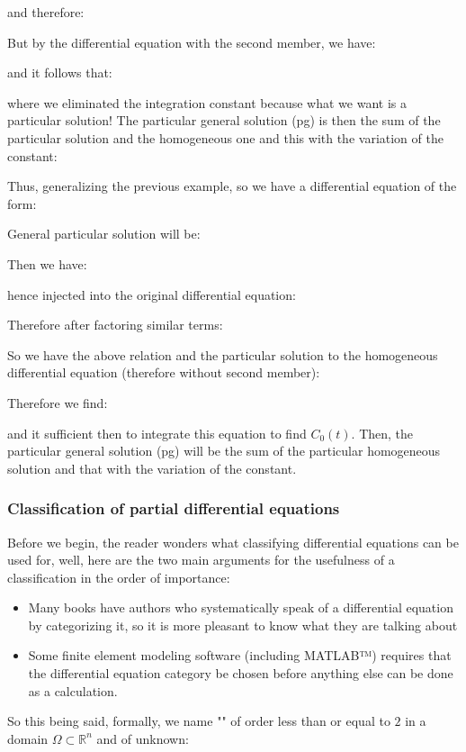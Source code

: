 	and therefore:
	
	But by the differential equation with the second member, we have:
	
	
	and it follows that:
	
	where we eliminated the integration constant because what we want is a particular solution! The particular general solution (pg) is then the sum of the particular solution and the homogeneous one and this with the variation of the constant:
	
	Thus, generalizing the previous example, so we have a differential equation of the form:
	
	General particular solution will be:
	
	Then we have:
	
	hence injected into the original differential equation:
	
	Therefore after factoring similar terms:
	
	So we have the above relation and the particular solution to the homogeneous differential equation (therefore without second member):
	
	Therefore we find:
	
	and it sufficient then to integrate this equation to find $C_0(t)$. Then, the particular general solution (pg) will be the sum of the particular homogeneous solution and that with the variation of the constant.
	
	\pagebreak
	\subsubsection{Classification of partial differential equations}
	Before we begin, the reader wonders what classifying differential equations can be used for, well, here are the two main arguments for the usefulness of a classification in the order of importance:
	\begin{itemize}
		\item Many books have authors who systematically speak of a differential equation by categorizing it, so it is more pleasant to know what they are talking about

		\item Some finite element modeling software (including MATLAB™) requires that the differential equation category be chosen before anything else can be done as a calculation.
	\end{itemize}
	So this being said, formally, we name "" of order less than or equal to $2$ in a domain $\Omega \subset \mathbb{R}^n$ and of unknown:
	
